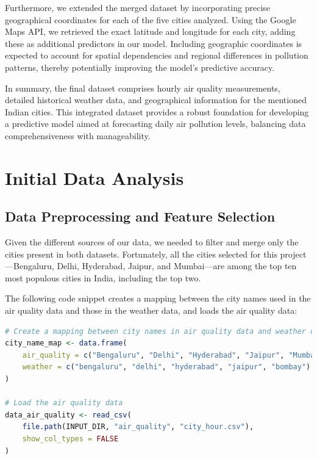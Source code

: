 \documentclass[12pt]{article}
\begin{document}
Furthermore, we extended the merged dataset by incorporating precise geographical coordinates for each of the five cities analyzed. Using the Google Maps API, we retrieved the exact latitude and longitude for each city, adding these as additional predictors in our model. Including geographic coordinates is expected to account for spatial dependencies and regional differences in pollution patterns, thereby potentially improving the model's predictive accuracy.

In summary, the final dataset comprises hourly air quality measurements, detailed historical weather data, and geographical information for the mentioned Indian cities. This integrated dataset provides a robust foundation for developing a predictive model aimed at forecasting daily air pollution levels, balancing data comprehensiveness with manageability.




\section{Initial Data Analysis}

\subsection{Data Preprocessing and Feature Selection}

Given the different sources of our data, we needed to filter and merge only the cities present in both datasets. Fortunately, all the cities selected for this project---Bengaluru, Delhi, Hyderabad, Jaipur, and Mumbai---are among the top ten most populous cities in India, including the top two.

The following code snippet creates a mapping between the city names used in the air quality data and those in the weather data, and loads the air quality data:

\begin{lstlisting}[language=R]
# Create a mapping between city names in air quality data and weather data
city_name_map <- data.frame(
    air_quality = c("Bengaluru", "Delhi", "Hyderabad", "Jaipur", "Mumbai"),
    weather = c("bengaluru", "delhi", "hyderabad", "jaipur", "bombay")
)

# Load the air quality data
data_air_quality <- read_csv(
    file.path(INPUT_DIR, "air_quality", "city_hour.csv"),
    show_col_types = FALSE
)
\end{lstlisting}
\end{document}
